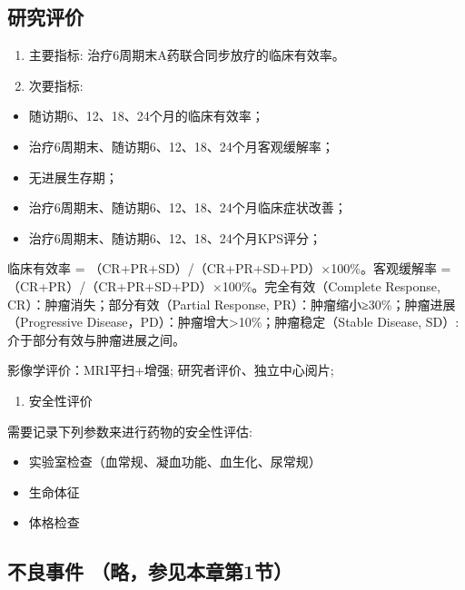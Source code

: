 \documentclass[
  chinese-hans,
  letterpaper,
  DIV=11,
  numbers=noendperiod]{scrreprt}
\providecommand{\tightlist}{%
  \setlength{\itemsep}{0pt}\setlength{\parskip}{0pt}}
\begin{document}
\subsection{研究评价}\label{ux7814ux7a76ux8bc4ux4ef7}

\begin{enumerate}
\def\labelenumi{\arabic{enumi}.}
\item
  主要指标: 治疗6周期末A药联合同步放疗的临床有效率。
\item
  次要指标:
\end{enumerate}

\begin{itemize}
\item
  随访期6、12、18、24个月的临床有效率；
\item
  治疗6周期末、随访期6、12、18、24个月客观缓解率；
\item
  无进展生存期；
\item
  治疗6周期末、随访期6、12、18、24个月临床症状改善；
\item
  治疗6周期末、随访期6、12、18、24个月KPS评分；
\end{itemize}

临床有效率 = （CR+PR+SD）/（CR+PR+SD+PD）×100\%。客观缓解率
=（CR+PR）/（CR+PR+SD+PD）×100\%。完全有效（Complete Response,
CR）：肿瘤消失；部分有效（Partial Response,
PR）：肿瘤缩小≥30\%；肿瘤进展（Progressive
Disease，PD）：肿瘤增大\textgreater10\%；肿瘤稳定（Stable Disease, SD）:
介于部分有效与肿瘤进展之间。

影像学评价：MRI平扫+增强; 研究者评价、独立中心阅片;

\begin{enumerate}
\def\labelenumi{\arabic{enumi}.}
\setcounter{enumi}{2}
\tightlist
\item
  安全性评价
\end{enumerate}

需要记录下列参数来进行药物的安全性评估:

\begin{itemize}
\item
  实验室检查（血常规、凝血功能、血生化、尿常规）
\item
  生命体征
\item
  体格检查
\end{itemize}

\subsection{不良事件
（略，参见本章第1节）}\label{ux4e0dux826fux4e8bux4ef6-ux7565ux53c2ux89c1ux672cux7ae0ux7b2c1ux8282}
\end{document}
